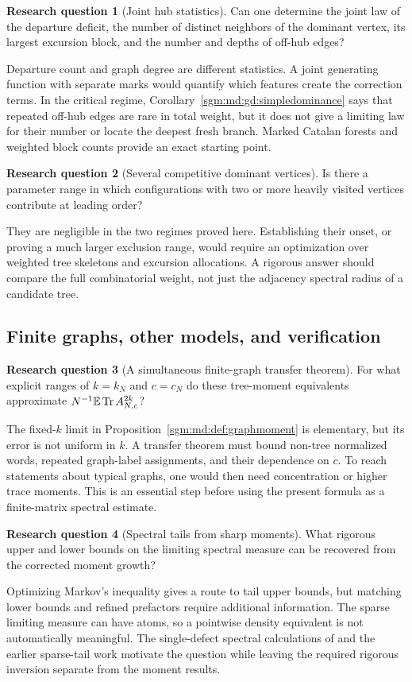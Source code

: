 \documentclass[11pt,letterpaper]{article}
\theoremstyle{remark}\newtheorem{remark}[theorem]{Remark}
\theoremstyle{definition}\newtheorem{definition}[theorem]{Definition}
\newtheorem{question}{Research question}[section]\theoremstyle{plain}
\begin{document}
\begin{question}[Joint hub statistics]\label{sgm:md:q:joint}
Can one determine the joint law of the departure deficit, the number
of distinct neighbors of the dominant vertex, its largest excursion
block, and the number and depths of off-hub edges?
\end{question}
Departure count and graph degree are different statistics. A joint
generating function with separate marks would quantify which
features create the correction terms. In the critical regime,
Corollary~\ref{sgm:md:gd:simpledominance} says that repeated off-hub edges
are rare in total weight, but it does not give a limiting law for
their number or locate the deepest fresh branch. Marked Catalan
forests and weighted block counts provide an exact starting point.

\begin{question}[Several competitive dominant vertices]\label{sgm:md:q:several}
Is there a parameter range in which configurations with two or more
heavily visited vertices contribute at leading order?
\end{question}
They are negligible in the two regimes proved here. Establishing
their onset, or proving a much larger exclusion range, would require
an optimization over weighted tree skeletons and excursion
allocations. A rigorous answer should compare the full combinatorial
weight, not just the adjacency spectral radius of a candidate tree.

\subsection{Finite graphs, other models, and verification}

\begin{question}[A simultaneous finite-graph transfer theorem]\label{sgm:md:q:finite}
For what explicit ranges of $k=k_N$ and $c=c_N$ do these tree-moment
equivalents approximate $N^{-1}\mathbb E\operatorname{Tr}A_{N,c}^{2k}$?
\end{question}
The fixed-$k$ limit in Proposition~\ref{sgm:md:def:graphmoment} is elementary,
but its error is not uniform in $k$. A transfer theorem must bound
non-tree normalized words, repeated graph-label assignments, and
their dependence on $c$. To reach statements about typical graphs,
one would then need concentration or higher trace moments. This is
an essential step before using the present formula as a finite-matrix
spectral estimate.

\begin{question}[Spectral tails from sharp moments]\label{sgm:md:q:tails}
What rigorous upper and lower bounds on the limiting spectral
measure can be recovered from the corrected moment growth?
\end{question}
Optimizing Markov's inequality gives a route to tail upper bounds,
but matching lower bounds and refined prefactors require additional
information. The sparse limiting measure can have atoms, so a
pointwise density equivalent is not automatically meaningful.
The single-defect spectral calculations of
\cite{SemerjianCugliandolo2002} and the earlier sparse-tail work
\cite{RodgersBray1988} motivate the question while leaving the
required rigorous inversion separate from the moment results.
\end{document}
